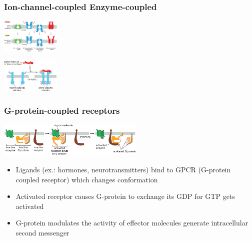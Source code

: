 \subsubsection*{Ion-channel-coupled \hspace{8mm} Enzyme-coupled}
\begin{minipage}{0.49\linewidth}
        \includegraphics[width=28mm]{src/Images/ion_channel.png}
\end{minipage}
\begin{minipage}{0.49\linewidth}
    \includegraphics[width=28mm]{src/Images/enzyme_coupled.png}
\end{minipage}

\subsubsection*{G-protein-coupled receptors}
\includegraphics[width=70mm]{src/Images/g_protein.png}

\begin{itemize}
    \item Ligands (ex.: hormones, neurotransmitters) bind to GPCR (G-protein coupled receptor) which changes conformation
    \item Activated receptor causes G-protein to exchange its GDP for GTP gets activated
    \item G-protein modulates the activity of effector molecules generate intracellular second messenger
\end{itemize}

